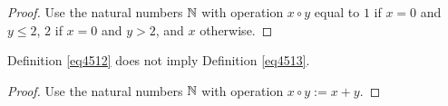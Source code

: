 \begin{proof} Use the natural numbers $\mathbb{N}$ with operation $x \circ y$ equal to $1$ if $x=0$ and $y \leq 2$, $2$ if $x=0$ and $y>2$, and $x$ otherwise.
\end{proof}

\begin{theorem}\label{4512_not_imply_4513}\leanok{} Definition \ref{eq4512} does not imply Definition \ref{eq4513}.
\end{theorem}

\begin{proof} Use the natural numbers $\mathbb{N}$ with operation $x \circ y := x + y$.
\end{proof}
